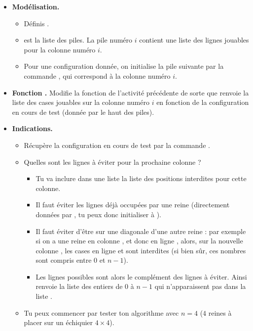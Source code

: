 \documentclass[11pt,class=report,crop=false]{standalone}
\begin{document}
\begin{activite}


\smallskip 

\begin{itemize}

  \item \textbf{Modélisation.}
  \begin{itemize}
    \item Définis .  
    \item {} est la liste des piles. La pile numéro $i$ contient une liste des lignes jouables pour la colonne numéro $i$.
    \item Pour une configuration donnée, on initialise la pile suivante par 
    la  commande , qui correspond à la colonne numéro $i$. 
   \end{itemize}

\smallskip

  \item \textbf{Fonction .} Modifie la fonction  de l'activité précédente de sorte que  renvoie la liste des cases jouables sur la colonne numéro $i$ en fonction de la configuration en cours de test (donnée par le haut des piles).

 \smallskip 
  
  \item \textbf{Indications.}
  \begin{itemize}
    \item Récupère la configuration en cours de test par la commande .
    \item Quelles sont les lignes à éviter pour la prochaine colonne ?
      \begin{itemize}
        \item Tu va inclure dans une liste  la liste des positions interdites pour cette colonne.
        \item Il faut éviter les lignes déjà occupées par une reine (directement données par , tu peux donc initialiser  à ).
        \item Il faut éviter d'être sur une diagonale d'une autre reine :
        par exemple si on a une reine en colonne , et donc en ligne , alors, sur la nouvelle colonne , les cases en ligne   et   sont interdites (si bien sûr, ces nombres sont compris entre $0$ et $n-1$).        
       \item Les lignes possibles sont alors le complément des lignes à éviter. Ainsi  renvoie la liste des entiers de $0$ à $n-1$ qui n'apparaissent pas dans la liste .
      \end{itemize}
      \item Tu peux commencer par tester ton algorithme avec $n=4$ ($4$ reines à placer sur un échiquier $4\times 4$).
   \end{itemize} 


\end{itemize}
\end{activite}
\end{document}
